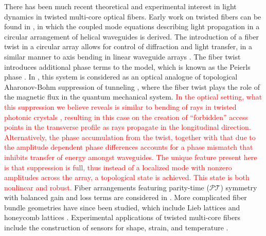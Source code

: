 \documentclass[reprint, amsmath,amssymb,aps,pra]{revtex4-2}
\newcommand{\revision}[1]{ \textcolor{red}{#1} }
\begin{document}
There has been much recent theoretical and experimental interest in light dynamics in twisted multi-core optical fibers. Early work on twisted fibers can be found in \cite{Longhi2007,Longhi2007b}, in which the coupled mode equations describing light propagation in a circular arrangement of helical waveguides is derived. The introduction of a fiber twist in a circular array allows for control of diffraction and light transfer, in a similar manner to axis bending in linear waveguide arrays \cite{Longhi2005}. The fiber twist introduces additional phase terms to the model, which is known as the Peierls phase \cite{Longhi2007,Peierls1933}. In \cite{Ornigotti2007}, this system is considered as an optical analogue of topological Aharonov-Bohm suppression of tunneling \cite{Loss1992}, where the fiber twist plays the role of the magnetic flux in the quantum mechanical system. \revision{In the optical setting, what this suppression we believe reveals is similar to bending of rays in twisted photonic crystals \cite{Russell}, resulting in this case on the creation of ``forbidden'' access points in the transverse profile as rays propagate in the longitudinal direction. Alternatively, the phase accumulation from the twist, together with that due to the amplitude dependent phase differences accounts for a phase mismatch that inhibits transfer of energy amongst waveguides. The unique feature present here is that suppression is full, thus instead of a localized mode with nonzero amplitudes across the array, a topological state is achieved. This state is both nonlinear and robust.} Fiber arrangements featuring parity-time ($\mathcal{PT}$) symmetry with balanced gain and loss terms are considered in \cite{Longhi2016,castro2016}. More complicated fiber bundle geometries have since been studied, which include Lieb lattices \cite{Marzuola2019bulk} and honeycomb lattices \cite{Ablowitz2014,Lumer2013}. Experimental applications of twisted multi-core fibers include the construction of sensors for shape, strain, and temperature \cite{Gannot2014,Westbrook2017}. 
\end{document}
